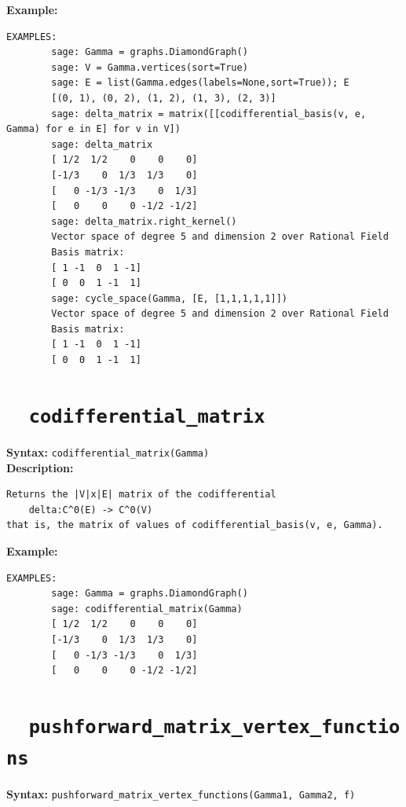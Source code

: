 \documentclass{article}
\begin{document}
\textbf{Example:}
\begin{verbatim}
EXAMPLES:
        sage: Gamma = graphs.DiamondGraph()  
        sage: V = Gamma.vertices(sort=True)   
        sage: E = list(Gamma.edges(labels=None,sort=True)); E
        [(0, 1), (0, 2), (1, 2), (1, 3), (2, 3)]
        sage: delta_matrix = matrix([[codifferential_basis(v, e, Gamma) for e in E] for v in V])        
        sage: delta_matrix  
        [ 1/2  1/2    0    0    0]
        [-1/3    0  1/3  1/3    0]
        [   0 -1/3 -1/3    0  1/3]
        [   0    0    0 -1/2 -1/2]
        sage: delta_matrix.right_kernel()
        Vector space of degree 5 and dimension 2 over Rational Field
        Basis matrix:
        [ 1 -1  0  1 -1]
        [ 0  0  1 -1  1]
        sage: cycle_space(Gamma, [E, [1,1,1,1,1]])
        Vector space of degree 5 and dimension 2 over Rational Field
        Basis matrix:
        [ 1 -1  0  1 -1]
        [ 0  0  1 -1  1]
\end{verbatim}

\section{\tt \ \ codifferential\_matrix}

\textbf{Syntax:} \verb}codifferential_matrix(Gamma)}\\


\textbf{Description:}
\begin{verbatim}
Returns the |V|x|E| matrix of the codifferential
    delta:C^0(E) -> C^0(V)
that is, the matrix of values of codifferential_basis(v, e, Gamma).

\end{verbatim}

\textbf{Example:}
\begin{verbatim}
EXAMPLES:
        sage: Gamma = graphs.DiamondGraph() 
        sage: codifferential_matrix(Gamma) 
        [ 1/2  1/2    0    0    0]
        [-1/3    0  1/3  1/3    0]
        [   0 -1/3 -1/3    0  1/3]
        [   0    0    0 -1/2 -1/2]
\end{verbatim}

\section{\tt \ \ pushforward\_matrix\_vertex\_functions}

\textbf{Syntax:} \verb}pushforward_matrix_vertex_functions(Gamma1, Gamma2, f)}\\
\end{document}
